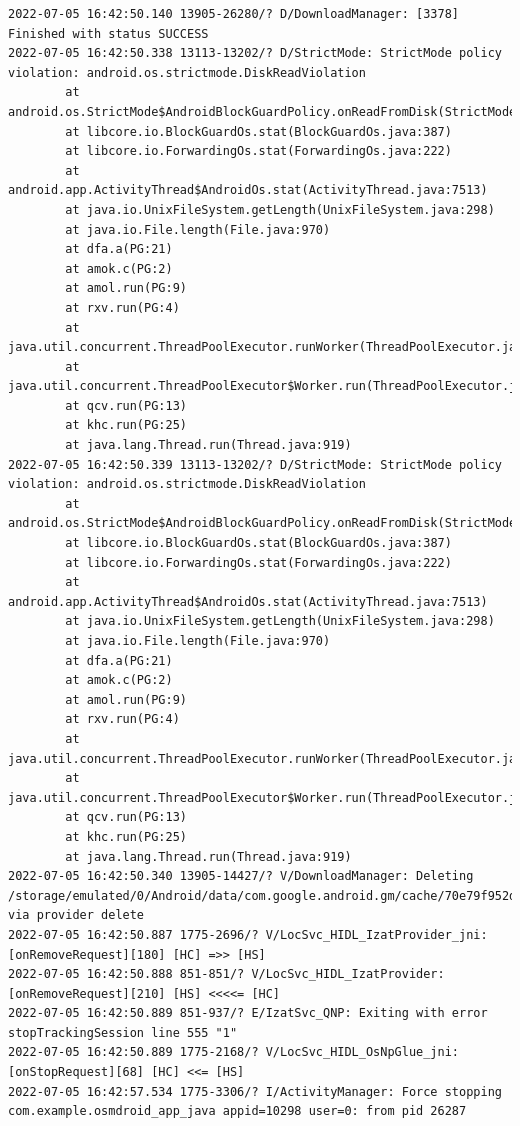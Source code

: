 \documentclass[a4paper,12pt]{book}
\begin{document}
\begin{lstlisting}
2022-07-05 16:42:50.140 13905-26280/? D/DownloadManager: [3378] Finished with status SUCCESS
2022-07-05 16:42:50.338 13113-13202/? D/StrictMode: StrictMode policy violation: android.os.strictmode.DiskReadViolation
        at android.os.StrictMode$AndroidBlockGuardPolicy.onReadFromDisk(StrictMode.java:1571)
        at libcore.io.BlockGuardOs.stat(BlockGuardOs.java:387)
        at libcore.io.ForwardingOs.stat(ForwardingOs.java:222)
        at android.app.ActivityThread$AndroidOs.stat(ActivityThread.java:7513)
        at java.io.UnixFileSystem.getLength(UnixFileSystem.java:298)
        at java.io.File.length(File.java:970)
        at dfa.a(PG:21)
        at amok.c(PG:2)
        at amol.run(PG:9)
        at rxv.run(PG:4)
        at java.util.concurrent.ThreadPoolExecutor.runWorker(ThreadPoolExecutor.java:1167)
        at java.util.concurrent.ThreadPoolExecutor$Worker.run(ThreadPoolExecutor.java:641)
        at qcv.run(PG:13)
        at khc.run(PG:25)
        at java.lang.Thread.run(Thread.java:919)
2022-07-05 16:42:50.339 13113-13202/? D/StrictMode: StrictMode policy violation: android.os.strictmode.DiskReadViolation
        at android.os.StrictMode$AndroidBlockGuardPolicy.onReadFromDisk(StrictMode.java:1571)
        at libcore.io.BlockGuardOs.stat(BlockGuardOs.java:387)
        at libcore.io.ForwardingOs.stat(ForwardingOs.java:222)
        at android.app.ActivityThread$AndroidOs.stat(ActivityThread.java:7513)
        at java.io.UnixFileSystem.getLength(UnixFileSystem.java:298)
        at java.io.File.length(File.java:970)
        at dfa.a(PG:21)
        at amok.c(PG:2)
        at amol.run(PG:9)
        at rxv.run(PG:4)
        at java.util.concurrent.ThreadPoolExecutor.runWorker(ThreadPoolExecutor.java:1167)
        at java.util.concurrent.ThreadPoolExecutor$Worker.run(ThreadPoolExecutor.java:641)
        at qcv.run(PG:13)
        at khc.run(PG:25)
        at java.lang.Thread.run(Thread.java:919)
2022-07-05 16:42:50.340 13905-14427/? V/DownloadManager: Deleting /storage/emulated/0/Android/data/com.google.android.gm/cache/70e79f952d963c8b4b5e9a3c16f590c6 via provider delete
2022-07-05 16:42:50.887 1775-2696/? V/LocSvc_HIDL_IzatProvider_jni: [onRemoveRequest][180] [HC] =>> [HS]
2022-07-05 16:42:50.888 851-851/? V/LocSvc_HIDL_IzatProvider: [onRemoveRequest][210] [HS] <<<<= [HC]
2022-07-05 16:42:50.889 851-937/? E/IzatSvc_QNP: Exiting with error stopTrackingSession line 555 "1"
2022-07-05 16:42:50.889 1775-2168/? V/LocSvc_HIDL_OsNpGlue_jni: [onStopRequest][68] [HC] <<= [HS]
2022-07-05 16:42:57.534 1775-3306/? I/ActivityManager: Force stopping com.example.osmdroid_app_java appid=10298 user=0: from pid 26287

\end{lstlisting}
\end{document}
